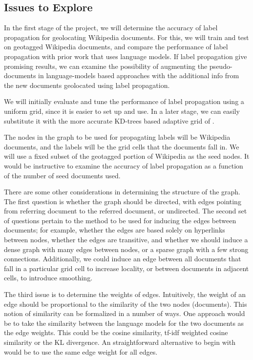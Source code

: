 \documentclass[11pt]{article}
\begin{document}
\subsection{Issues to Explore}
In the first stage of the project, we will determine the accuracy of label propagation for geolocating Wikipedia documents. 
For this, we will train and test on geotagged Wikipedia documents, and compare the performance of label propagation with prior work that uses language models.
If label propagation give promising results, we can examine the possibility of augmenting the pseudo-documents in language-models based approaches 
with the additional info from the new documents geolocated using label propagation.

We will initially evaluate and tune the performance of label propagation using a uniform grid, since it is easier to set up and use. 
In a later stage, we can easily substitute it with the more accurate KD-trees based adaptive grid of \cite{rolleretal:12}.

The nodes in the graph to be used for propagating labels will be Wikipedia documents, and the labels will be the grid cells that the documents fall in.
We will use a fixed subset of the geotagged portion of Wikipedia as the seed nodes. It would be instructive to examine the accuracy of label propagation
as a function of the number of seed documents used. 

There are some other considerations in determining the structure of the graph. The first question is whether the graph should be directed, 
with edges pointing from referring document to the referred document, or undirected. The second set of questions pertain to the method to be used
for inducing the edges between documents; for example, whether the edges are based solely on hyperlinks between nodes, whether the edges are transitive, 
and whether we should induce a dense graph with many edges between nodes, or a sparse graph with a few strong connections. Additionally, we could induce 
an edge between all documents that fall in a particular grid cell to increase locality, or between documents in adjacent cells, to introduce smoothing.

The third issue is to determine the weights of edges. Intuitively, the weight of an edge should be proportional to the similarity of the two nodes (documents). 
This notion of similarity can be formalized in a number of ways. One approach would be to take the similarity between the language models for the 
two documents as the edge weights. This could be the cosine similarity, tf-idf weighted cosine similarity or the KL divergence.
An straightforward alternative to begin with would be to use the same edge weight for all edges. 
 
\end{document}
